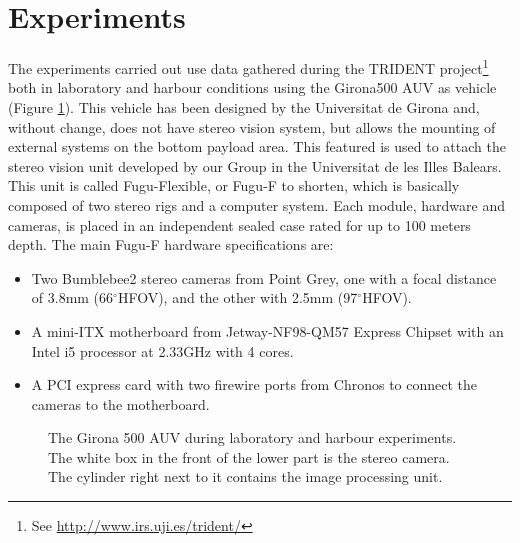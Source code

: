 \documentclass[conference]{IEEEtran}
\newcommand{\degree}{\ensuremath{^\circ}}
\begin{document}
\section{Experiments
  \label{experiments}
}

The experiments carried out use data gathered during the TRIDENT project\footnote{See \url{http://www.irs.uji.es/trident/}} both in laboratory and harbour conditions using the Girona500 AUV \cite{Ribas2012} as vehicle (Figure \ref{g500}). This vehicle has been designed by the Universitat de Girona and, without change, does not have stereo vision system, but allows the mounting of external systems on the bottom payload area. This featured is used to attach the stereo vision unit developed by our Group in the Universitat de les Illes Balears. This unit is called Fugu-Flexible, or Fugu-F to shorten, which is basically composed of two stereo rigs and a computer system. Each module, hardware and cameras, is placed in an independent sealed case rated for up to 100 meters depth. The main Fugu-F hardware specifications are:

\begin{itemize}
  \item Two Bumblebee2 stereo cameras from Point Grey, one with a focal distance of 3.8mm (66\degree HFOV), and the other with 2.5mm (97\degree HFOV).
  \item A mini-ITX motherboard from Jetway-NF98-QM57 Express Chipset with an Intel i5 processor at 2.33GHz with 4 cores.
  \item A PCI express card with two firewire ports from Chronos to connect the cameras to the motherboard.
\end{itemize}

\begin{figure}
  \noindent{}
  \caption{The Girona 500 AUV during laboratory and harbour experiments. The white box in the front of the lower part is the stereo camera. The cylinder right next to it contains the image processing unit.}
  \label{g500}
\end{figure}
\end{document}
